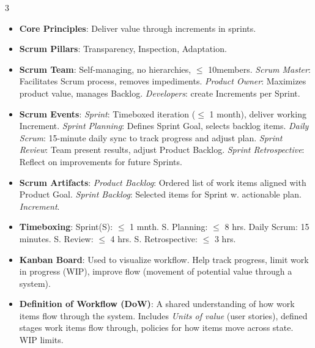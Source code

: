 \documentclass[a4paper, 10pt, landscape]{article}
\begin{document}
\begin{multicols*}{3}
\begin{itemize}
	\item \textbf{Core Principles}:  Deliver value through increments in sprints.  
	\item \textbf{Scrum Pillars}:  Transparency, Inspection, Adaptation.  
	\item \textbf{Scrum Team}: Self-managing, no hierarchies, $\leq$ 10members. \textit{Scrum Master}: Facilitates Scrum process, removes impediments. \textit{Product Owner}: Maximizes product value, manages Backlog. \textit{Developers}: create Increments per Sprint.  
	\item \textbf{Scrum Events}:  \textit{Sprint}: Timeboxed iteration ($\leq$ 1 month), deliver working Increment. \textit{Sprint Planning}: Defines Sprint Goal, selects backlog items. \textit{Daily Scrum}: 15-minute daily sync to track progress and adjust plan. \textit{Sprint Review}: Team present results, adjust Product Backlog. \textit{Sprint Retrospective}: Reflect on improvements for future Sprints.  
    \item \textbf{Scrum Artifacts}:  \textit{Product Backlog}: Ordered list of work items aligned with Product Goal. \textit{Sprint Backlog}: Selected items for Sprint w. actionable plan. \textit{Increment}.
    \item \textbf{Timeboxing}:  Sprint(S): $\leq$ 1 mnth. S. Planning: $\leq$  8 hrs. Daily Scrum: 15 minutes.  S. Review:  $\leq$  4 hrs. S. Retrospective: $\leq$ 3 hrs.  
    \item \textbf{Kanban Board}: Used to visualize workflow. Help track progress, limit work in progress (WIP), improve flow (movement of potential value through a system).
    \item \textbf{Definition of Workflow (DoW)}: A shared understanding of how work items flow through the system. Includes \textit{Units of value} (user stories), defined stages work items flow through, policies for how items move across state. WIP limits. 
\end{itemize}


\end{multicols*}
\end{document}

